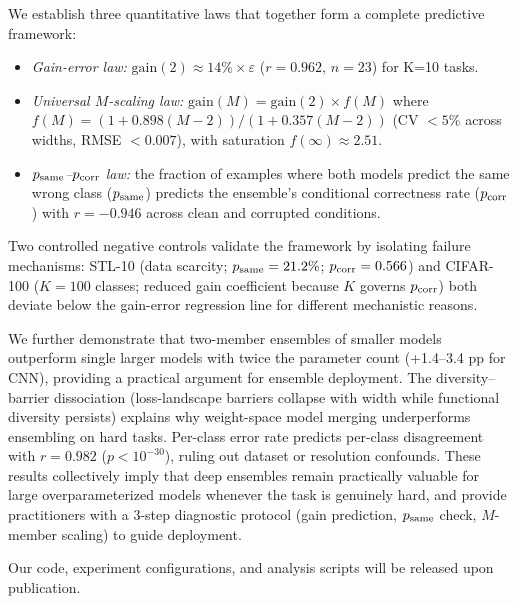 \documentclass[11pt]{article}
\begin{document}
We establish three quantitative laws that together form a complete
predictive framework:
\begin{itemize}
  \item \emph{Gain-error law:} $\mathrm{gain}(2) \approx 14\%\times\varepsilon$
        ($r=0.962$, $n=23$) for K=10 tasks.
  \item \emph{Universal $M$-scaling law:} $\mathrm{gain}(M) = \mathrm{gain}(2)
        \times f(M)$ where $f(M) = (1+0.898(M-2))/(1+0.357(M-2))$ (CV $<5\%$
        across widths, RMSE $<0.007$), with saturation $f(\infty)\approx 2.51$.
  \item \emph{$p_{\rm same}$--$p_{\rm corr}$ law:} the fraction of examples where
        both models predict the same wrong class ($p_{\rm same}$) predicts the
        ensemble's conditional correctness rate ($p_{\rm corr}$) with
        $r=-0.946$ across clean and corrupted conditions.
\end{itemize}
Two controlled negative controls validate the framework by isolating failure
mechanisms: STL-10 (data scarcity; $p_{\rm same}=21.2\%$; $p_{\rm corr}=0.566$)
and CIFAR-100 ($K=100$ classes; reduced gain coefficient because $K$
governs $p_{\rm corr}$) both deviate below the gain-error regression line for
different mechanistic reasons.

We further demonstrate that two-member ensembles of smaller models
outperform single larger models with twice the parameter count
(+1.4--3.4 pp for CNN), providing a practical argument for ensemble deployment.
The diversity--barrier dissociation (loss-landscape barriers collapse
with width while functional diversity persists) explains why
weight-space model merging underperforms ensembling on hard tasks.
Per-class error rate predicts per-class disagreement with $r = 0.982$
($p < 10^{-30}$), ruling out dataset or resolution confounds.  These
results collectively imply that deep ensembles remain practically
valuable for large overparameterized models whenever the task is genuinely hard,
and provide practitioners with a 3-step diagnostic protocol
(gain prediction, $p_{\rm same}$ check, $M$-member scaling) to guide deployment.

Our code, experiment configurations, and analysis scripts will be released
upon publication.
\end{document}

